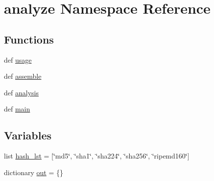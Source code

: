 \hypertarget{namespaceanalyze}{\section{analyze Namespace Reference}
\label{namespaceanalyze}
}
\subsection*{Functions}
\begin{DoxyCompactItemize}
\item 
def \hyperlink{namespaceanalyze_a6cb1b4ba899e72de6105802d17752548}{usage}
\item 
def \hyperlink{namespaceanalyze_a3516d0c6d65218119c786aba0e9c6111}{assemble}
\item 
def \hyperlink{namespaceanalyze_aa4487644e19145a8a0c3ba98bfe702c0}{analysis}
\item 
def \hyperlink{namespaceanalyze_a963dba040ab379c7fe19253c37056794}{main}
\end{DoxyCompactItemize}
\subsection*{Variables}
\begin{DoxyCompactItemize}
\item 
list \hyperlink{namespaceanalyze_a1762bc2a0a6b022eefa0f561255d5a2e}{hash\-\_\-lst} = \mbox{[}\char`\"{}md5\char`\"{}, \char`\"{}sha1\char`\"{}, \char`\"{}sha224\char`\"{}, \char`\"{}sha256\char`\"{}, \char`\"{}ripemd160\char`\"{}\mbox{]}
\item 
dictionary \hyperlink{namespaceanalyze_a72c64954c54f4ec0b44182dc499cd0c9}{out} = \{\}
\end{DoxyCompactItemize}


